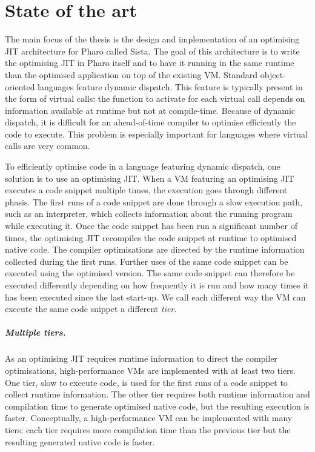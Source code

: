 \documentclass[a4paper,12pt,twoside]{../includes/ThesisStyle}
\begin{document}
\fi

\chapter{State of the art}
\label{chap:stateOfTheArt}
\minitoc

The main focus of the thesis is the design and implementation of an optimising JIT architecture for Pharo called Sista. The goal of this architecture is to write the optimising JIT in Pharo itself and to have it running in the same runtime than the optimised application on top of the existing VM. Standard object-oriented languages feature dynamic dispatch. This feature is typically present in the form of virtual calls: the function to activate for each virtual call depends on information available at runtime but not at compile-time. Because of dynamic dispatch, it is difficult for an ahead-of-time compiler to optimise efficiently the code to execute. This problem is especially important for languages where virtual calls are very common. 

To efficiently optimise code in a language featuring dynamic dispatch, one solution is to use an optimising JIT. When a VM featuring an optimising JIT executes a code snippet multiple times, the execution goes through different phasis. The first runs of a code snippet are done through a slow execution path, such as an interpreter, which collects information about the running program while executing it. Once the code snippet has been run a significant number of times, the optimising JIT recompiles the code snippet at runtime to optimised native code. The compiler optimisations are directed by the runtime information collected during the first runs. Further uses of the same code snippet can be executed using the optimised version. The same code snippet can therefore be executed differently depending on how frequently it is run and how many times it has been executed since the last start-up. We call each different way the VM can execute the same code snippet a different \emph{tier}.

\paragraph{Multiple tiers.} As an optimising JIT requires runtime information to direct the compiler optimisations, high-performance VMs are implemented with at least two tiers. One tier, slow to execute code, is used for the first runs of a code snippet to collect runtime information. The other tier requires both runtime information and compilation time to generate optimised native code, but the resulting execution is faster. Conceptually, a high-performance VM can be implemented with many tiers: each tier requires more compilation time than the previous tier but the resulting generated native code is faster.
\end{document}
